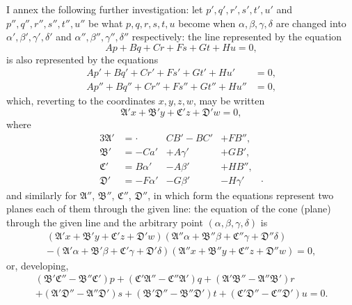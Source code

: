 \documentclass[11pt,a4paper]{article}
\theoremstyle{plain}
\begin{document}
I annex the following further investigation: let $p', q', r', s', t', u'$ and $p'', q'', r'', s'', t'', u''$ be what $p, q, r, s, t, u$ become when $\alpha, \beta, \gamma, \delta$ are changed into $\alpha', \beta', \gamma', \delta'$ and $\alpha'', \beta'', \gamma'', \delta''$ respectively: the line represented by the equation
\[
Ap + Bq + Cr + Fs + Gt + Hu = 0,
\]
is also represented by the equations
\begin{align*}
Ap' + Bq' + Cr' + Fs' + Gt' + Hu' &= 0,\\
Ap'' + Bq'' + Cr'' + Fs'' + Gt'' + Hu'' &= 0,
\end{align*}
which, reverting to the coordinates $x, y, z, w$, may be written
\[
\mathfrak{A}'x + \mathfrak{B}'y + \mathfrak{C}'z + \mathfrak{D}'w = 0,
\]
where
\begin{alignat*}{3}
\mathfrak{A}' &= \cdot\qquad & CB' - BC' &+ FB'',\\
\mathfrak{B}' &= -Ca' &+ A\gamma' &+ GB',\\
\mathfrak{C}' &= B\alpha' &- A\beta' &+ HB'',\\
\mathfrak{D}' &= -F\alpha' &- G\beta' &- H\gamma' &\cdot
\end{alignat*}
and similarly for $\mathfrak{A}''$, $\mathfrak{B}''$, $\mathfrak{C}''$, $\mathfrak{D}''$, in which form the equations represent two planes each of them through the given line: the equation of the cone (plane) through the given line and the arbitrary point $(\alpha, \beta, \gamma, \delta)$ is
\begin{multline*}
(\mathfrak{A}'x + \mathfrak{B}'y + \mathfrak{C}'z + \mathfrak{D}'w)(\mathfrak{A}''\alpha + \mathfrak{B}''\beta + \mathfrak{C}''\gamma + \mathfrak{D}''\delta)\\
- (\mathfrak{A}'\alpha + \mathfrak{B}'\beta + \mathfrak{C}'\gamma + \mathfrak{D}'\delta)(\mathfrak{A}''x + \mathfrak{B}''y + \mathfrak{C}''z + \mathfrak{D}''w) = 0,
\end{multline*}
or, developing,
\begin{multline*}
(\mathfrak{B}'\mathfrak{C}'' - \mathfrak{B}''\mathfrak{C}')p + (\mathfrak{C}'\mathfrak{A}'' - \mathfrak{C}''\mathfrak{A}')q + (\mathfrak{A}'\mathfrak{B}'' - \mathfrak{A}''\mathfrak{B}')r\\
+ (\mathfrak{A}'\mathfrak{D}'' - \mathfrak{A}''\mathfrak{D}')s + (\mathfrak{B}'\mathfrak{D}'' - \mathfrak{B}''\mathfrak{D}')t + (\mathfrak{C}'\mathfrak{D}'' - \mathfrak{C}''\mathfrak{D}')u = 0.
\end{multline*}
\end{document}

